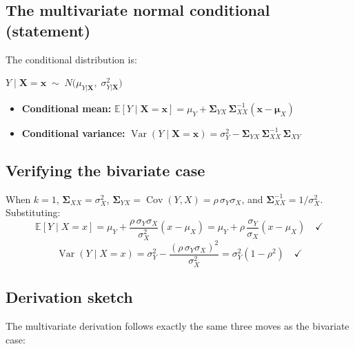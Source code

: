 \documentclass[11pt]{article}
\newcommand{\Var}{\operatorname{Var}}
\newcommand{\Cov}{\operatorname{Cov}}
\begin{document}
\subsection{The multivariate normal conditional (statement)}

The conditional distribution is:
\begin{tcolorbox}[colback=blue!5, colframe=blue!50]
$Y \mid \bm{X}=\bm{x} \;\sim\; N\!\Big(\mu_{Y|\bm{X}},\;\sigma^2_{Y|\bm{X}}\Big)$

\medskip
\begin{itemize}[leftmargin=2em]
\item \textbf{Conditional mean:}\quad
$\displaystyle\mathbb{E}[Y\mid \bm{X}=\bm{x}] = \mu_Y + \bm{\Sigma}_{YX}\,\bm{\Sigma}_{XX}^{-1}(\bm{x} - \bm{\mu}_X)$

\medskip
\item \textbf{Conditional variance:}\quad
$\displaystyle\Var(Y\mid \bm{X}=\bm{x}) = \sigma_Y^2 - \bm{\Sigma}_{YX}\,\bm{\Sigma}_{XX}^{-1}\,\bm{\Sigma}_{XY}$
\end{itemize}
\end{tcolorbox}

\subsection{Verifying the bivariate case}

When $k=1$, $\bm{\Sigma}_{XX}=\sigma_X^2$, $\bm{\Sigma}_{YX}=\Cov(Y,X)=\rho\,\sigma_Y\sigma_X$, and $\bm{\Sigma}_{XX}^{-1}=1/\sigma_X^2$.  Substituting:
\[
\mathbb{E}[Y\mid X=x] = \mu_Y + \frac{\rho\,\sigma_Y\sigma_X}{\sigma_X^2}(x-\mu_X)
= \mu_Y + \rho\,\frac{\sigma_Y}{\sigma_X}(x-\mu_X) \quad\checkmark
\]
\[
\Var(Y\mid X=x) = \sigma_Y^2 - \frac{(\rho\,\sigma_Y\sigma_X)^2}{\sigma_X^2}
= \sigma_Y^2(1-\rho^2) \quad\checkmark
\]

\subsection{Derivation sketch}

The multivariate derivation follows exactly the same three moves as the bivariate case:
\end{document}
